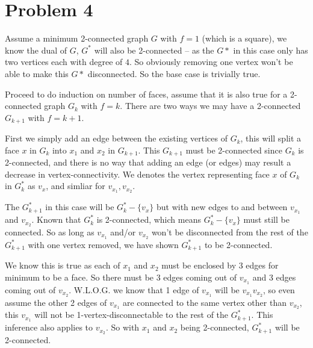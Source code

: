 \documentclass[11pt]{article}
\begin{document}
%
%






\section*{Problem 4}


Assume a minimum 2-connected graph $G$ with $f = 1$ (which is a square), we know the dual of $G$, $G^*$ will also be 2-connected -- as the $G*$ in this case only has two vertices each with degree of $4$. So obviously removing one vertex won't be able to make this $G*$ disconnected. So the base case is trivially true.\newline

Proceed to do induction on number of faces, assume that it is also true for a 2-connected graph $G_k$ with $f=k$. There are two ways we may have a 2-connected $G_{k+1}$ with $f = k+1$.\newline

First we simply add an edge between the existing vertices of $G_k$, this will split a face $x$ in $G_k$ into $x_1$ and $x_2$ in $G_{k+1}$. This $G_{k+1}$ must be 2-connected since $G_k$ is 2-connected, and there is no way that adding an edge (or edges) may result a decrease in vertex-connectivity. We denotes the vertex representing face $x$ of $G_k$ in $G^*_k$ as $v_x$, and simliar for $v_{x_1}, v_{x_2}$.

The $G^*_{k+1}$ in this case will be $G^*_k - \{v_x\}$ but with new edges to and between $v_{x_1}$ and $v_{x_2}$. Known that $G^*_k$ is 2-connected, which means $G^*_k - \{v_x\}$ must still be connected. So as long as $v_{x_1}$ and/or $v_{x_2}$ won't be disconnected from the rest of the $G^*_{k+1}$ with one vertex removed, we have shown $G^*_{k+1}$ to be 2-connected.


We know this is true as each of $x_1$ and $x_2$ must be enclosed by 3 edges for minimum to be a face. So there must be 3 edges coming out of $v_{x_1}$ and 3 edges coming out of $v_{x_2}$. W.L.O.G. we know that 1 edge of $v_{x_1}$ will be $v_{x_1}v_{x_2}$, so even assume the other 2 edges of $v_{x_1}$ are connected to the same vertex other than $v_{x_2}$, this $v_{x_1}$ will not be 1-vertex-disconnectable to the rest of the $G^*_{k+1}$. This inference also applies to $v_{x_2}$. So with $x_1$ and $x_2$ being 2-connected, $G^*_{k+1}$ will be 2-connected.\newline
\end{document}
